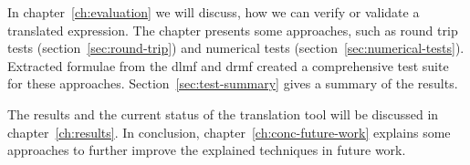 In chapter~\ref{ch:evaluation} we will discuss, how we can verify or validate a translated expression. The chapter presents some approaches, such as round trip tests (section~\ref{sec:round-trip}) and numerical tests (section~\ref{sec:numerical-tests}). Extracted formulae from the \gls*{dlmf} and \gls*{drmf} created a comprehensive test suite for these approaches. Section~\ref{sec:test-summary} gives a summary of the results.

The results and the current status of the translation tool will be discussed in chapter~\ref{ch:results}. In conclusion, chapter~\ref{ch:conc-future-work} explains some approaches to further improve the explained techniques in future work.